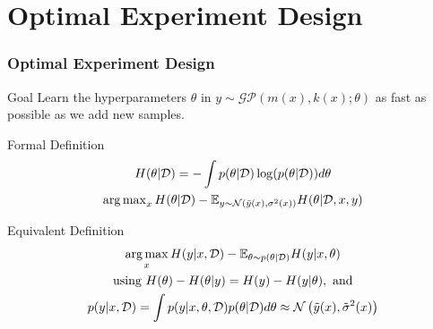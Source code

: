 \section{Optimal Experiment Design}

\begin{frame}[t]
	
	\frametitle{Optimal Experiment Design}
	
	\begin{block}{Goal}
		Learn the hyperparameters \(\theta\) in \(y \sim \mathcal{GP}(m(x), k(x); \theta)\) as fast as possible as we add new samples.
	\end{block}
	
	\begin{block}{Formal Definition}
		\setlength\abovedisplayskip{0pt}
		\begin{gather*}
			H(\theta|\mathcal{D}) = -\int p(\theta|\mathcal{D}) \log (p(\theta|\mathcal{D}))d\theta \\
			\textstyle \operatorname*{arg\,max}_x H(\theta|\mathcal{D}) - \mathbb{E}_{y \sim \operatorname*{\mathcal{N}}\left(\bar{y}(x), \sigma^2(x)\right)}H(\theta|\mathcal{D},x,y)
			\label{E:ig:theta}
		\end{gather*}
	\end{block}

	\begin{block}{Equivalent Definition}
	\setlength\abovedisplayskip{0pt}
		\begin{gather*}
			\operatorname*{arg\,max}_x H(y|x,\mathcal{D}) - \mathbb{E}_{\theta \sim p(\theta|\mathcal{D})}H(y|x,\theta) \\
			\text{using} \ H(\theta) - H(\theta|y) = H(y) - H(y|\theta), \ \text{and} \\
			p(y|x,\mathcal{D}) = \int p(y|x,\theta, \mathcal{D})p(\theta|\mathcal{D})d\theta \approx \operatorname*{\mathcal{N}}\left(\tilde{y}(x), \tilde{\sigma}^2(x)\right)
			\label{E:ig:y}
		\end{gather*}
	\end{block}

\end{frame}

